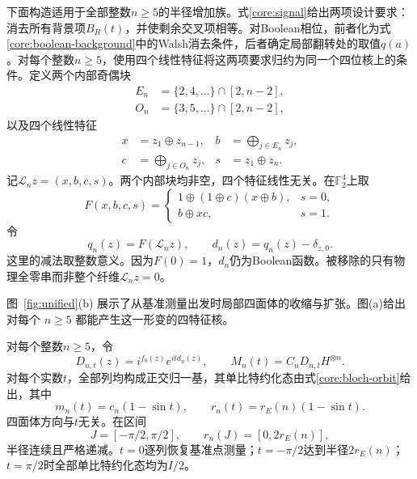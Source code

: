 下面构造适用于全部整数$n\ge5$的半径增加族。式\eqref{core:signal}给出两项设计要求：消去所有背景项$B_R(t)$，并使剩余交叉项相等。对Boolean相位，前者化为式\eqref{core:boolean-background}中的Walsh消去条件，后者确定局部翻转处的取值$q(a)$。对每个整数$n\ge5$，使用四个线性特征将这两项要求归约为同一个四位核上的条件。定义两个内部奇偶块
\begin{equation}
 \begin{aligned}
 E_n&=\{2,4,\ldots\}\cap[2,n-2],\\
 O_n&=\{3,5,\ldots\}\cap[2,n-2],
 \end{aligned}
\end{equation}
以及四个线性特征
\begin{align}
 x&=z_1\oplus z_{n-1},& b&=\bigoplus_{j\in E_n}z_j,\nonumber\\
 c&=\bigoplus_{j\in O_n}z_j,& s&=z_1\oplus z_n.
 \label{core:features}
\end{align}
记$\mathcal L_nz=(x,b,c,s)$。两个内部块均非空，四个特征线性无关。在$\mathbb F_2^4$上取
\begin{equation}
 F(x,b,c,s)=\begin{cases}
 1\oplus(1\oplus c)(x\oplus b),&s=0,\\
 b\oplus xc,&s=1.
 \end{cases}
 \label{core:kernel}
\end{equation}
令
\begin{equation}
 q_n(z)=F(\mathcal L_nz),\qquad
 d_n(z)=q_n(z)-\delta_{z,0}.
 \label{core:support}
\end{equation}
这里的减法取整数意义。因为$F(0)=1$，$d_n$仍为Boolean函数。被移除的只有物理全零串而非整个纤维$\mathcal L_nz=0$。

图~\ref{fig:unified}(b) 展示了从基准测量出发时局部四面体的收缩与扩张。图(a)给出对每个 $n\ge5$ 都能产生这一形变的四特征核。

\begin{theorem}[统一半径增加族]
\label{core:unified-theorem}
对每个整数$n\ge5$，令
\begin{equation}
 D_{n,t}(z)=i^{f_0(z)}e^{itd_n(z)},\qquad
 M_n(t)=C_nD_{n,t}H^{\otimes n}.
 \label{core:unified-measurement}
\end{equation}
对每个实数$t$，全部列均构成正交归一基，其单比特约化态由式\eqref{core:bloch-orbit}给出，其中
\begin{equation}
 m_n(t)=c_n(1-\sin t),\qquad
 r_n(t)=r_E(n)(1-\sin t).
 \label{core:radius}
\end{equation}
四面体方向与$t$无关。在区间
\begin{equation}
 J=[-\pi/2,\pi/2],\qquad r_n(J)=[0,2r_E(n)],
 \label{core:interval}
\end{equation}
半径连续且严格递减。$t=0$逐列恢复基准点测量；$t=-\pi/2$达到半径$2r_E(n)$；$t=\pi/2$时全部单比特约化态均为$I/2$。
\end{theorem}

